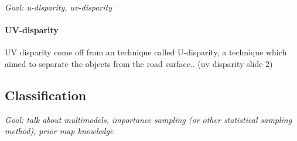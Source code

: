 \textit{Goal: u-disparity, uv-disparity}

\paragraph*{UV-disparity} 

UV disparity come off from an technique called U-disparity, a technique which aimed to separate the objects from the road surface.. (uv disparity slide 2)


\subsection{Classification}

\textit{Goal: talk about multimodels, importance sampling (or other statistical sampling method), prior map knowledge }

